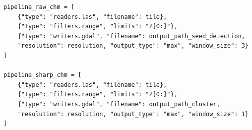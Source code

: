 \begin{lstlisting}[label={lst:pdal_chm}, caption={[CHM Erzeugung]Zweifache CHM-Erzeugung}, breaklines=true, breakatwhitespace=true]
pipeline_raw_chm = [
    {"type": "readers.las", "filename": tile},
    {"type": "filters.range", "limits": "Z[0:]"},
    {"type": "writers.gdal", "filename": output_path_seed_detection,
    "resolution": resolution, "output_type": "max", "window_size": 3}
]

pipeline_sharp_chm = [
    {"type": "readers.las", "filename": tile},
    {"type": "filters.range", "limits": "Z[0:]"},
    {"type": "writers.gdal", "filename": output_path_cluster,
    "resolution": resolution, "output_type": "max", "window_size": 1}
]
\end{lstlisting}
